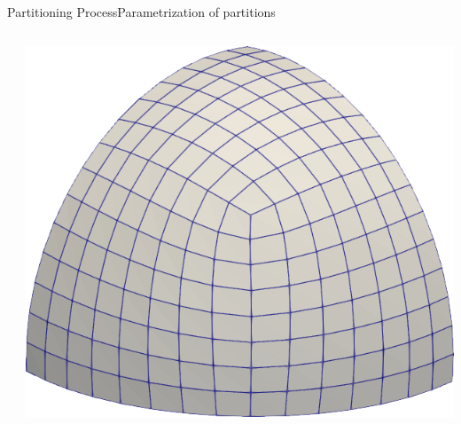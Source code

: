 \documentclass[compress,10pt,aspectratio=169]{beamer}
\begin{document}
\begin{frame}{Partitioning Process}{Parametrization of partitions}
{\begin{columns}
\begin{column}{0.4\textwidth}
\end{column}
\hspace{-0.5cm}
\begin{column}{0.4\textwidth}
\centering
\includegraphics[scale=0.22]{images/huit_quad.png}
\end{column}
\end{columns}
}
\end{frame}
\end{document}

